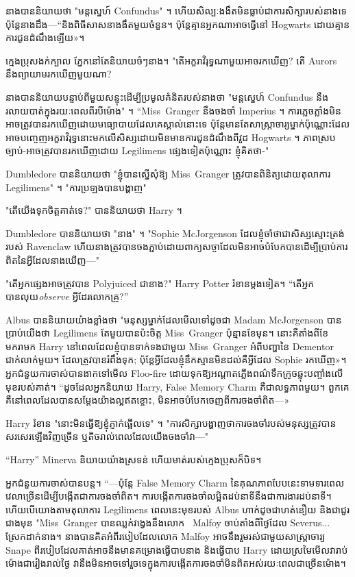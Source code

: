 {នាងបាននិយាយថា "មន្តស្នេហ៍ Confundus" ។ ហើយសិល្បៈងងឹតមិនធ្លាប់ជាការសិក្សារបស់នាងទេ ប៉ុន្តែនាងដឹង—“និងពិធីសាសនាងងឹតមួយចំនួន។ ប៉ុន្តែ​គ្មាន​អ្នក​ណា​អាច​ធ្វើ​នៅ Hogwarts ដោយ​គ្មាន​ការ​ជូន​ដំណឹង​ឡើយ»។

ក្មេងប្រុសងក់ក្បាល ភ្នែកនៅតែនិយាយចំៗនាង។ "តើអក្ខរាវិរុទ្ធណាមួយអាចរកឃើញ? តើ Aurors នឹងព្យាយាមរកឃើញមួយណា?

នាងបាននិយាយបន្ទាប់ពីមួយសន្ទុះដើម្បីប្រមូលគំនិតរបស់នាងថា "មន្តស្នេហ៍ Confundus នឹងរលាយបាត់ក្នុងរយៈពេលពីរបីម៉ោង" ។ “Miss~Granger នឹងចងចាំ Imperius ។ ការភ្លេចភ្លាំងមិនអាចត្រូវបានរកឃើញដោយមធ្យោបាយដែលគេស្គាល់នោះទេ ប៉ុន្តែមានតែសាស្រ្តាចារ្យម្នាក់ប៉ុណ្ណោះដែលអាចបញ្ចេញអក្ខរាវិរុទ្ធនោះមកលើសិស្សដោយមិនមានការជូនដំណឹងពីវួដ Hogwarts ។ ភាពស្របច្បាប់-អាចត្រូវបានរកឃើញដោយ Legilimens ផ្សេងទៀតប៉ុណ្ណោះ ខ្ញុំគិតថា-"

Dumbledore បាននិយាយថា "ខ្ញុំបានស្នើសុំឱ្យ Miss~Granger ត្រូវបានពិនិត្យដោយតុលាការ Legilimens" ។ "ការប្រឡងបានបង្ហាញ"

"តើយើងទុកចិត្តគាត់ទេ?" បាននិយាយថា Harry ។

Dumbledore បាននិយាយថា "នាង" ។ "Sophie McJorgenson ដែលខ្ញុំចាំថាជាសិស្សស្មោះត្រង់របស់ Ravenclaw ហើយនាងត្រូវបានចងភ្ជាប់ដោយពាក្យសច្ចាដែលមិនអាចបំបែកបានដើម្បីប្រាប់ការពិតនៃអ្វីដែលនាងឃើញ—"

"តើ​អ្នក​ផ្សេង​អាច​ត្រូវ​បាន Polyjuiced ជា​នាង?" Harry Potter រំខានម្តងទៀត។ “តើអ្នកបានលុយ\emph{observe} អ្វីដែរលោកគ្រូ?”

Albus បាននិយាយយ៉ាងខ្លាំងថា "មនុស្សម្នាក់ដែលមើលទៅដូចជា Madam McJorgenson បានប្រាប់យើងថា Legilimens តែមួយបានប៉ះចិត្ត Miss~Granger ប៉ុន្មានខែមុន។ នោះគឺតាំងពីខែមករាមក Harry នៅពេលដែលខ្ញុំបានទាក់ទងជាមួយ Miss~Granger អំពីបញ្ហានៃ Dementor ជាក់លាក់មួយ។ ដែលត្រូវបានរំពឹងទុក; ប៉ុន្តែ​អ្វី​ដែល​ខ្ញុំ​នឹក​ស្មាន​មិន​ដល់​គឺ​អ្វី​ដែល Sophie រក​ឃើញ»។ អ្នកជំនួយការចាស់បានងាកទៅមើល Floo-fire ដោយទុកឱ្យអណ្តាតភ្លើងពណ៌ទឹកក្រូចឆ្លុះបញ្ចាំងលើមុខរបស់គាត់។ “ដូចដែលអ្នកនិយាយ Harry, False Memory Charm គឺជាលទ្ធភាពមួយ។ ពួក​គេ​គឺ​នៅ​ពេល​ដែល​បាន​សម្ដែង​យ៉ាង​ល្អ​ឥត​ខ្ចោះ, មិន​អាច​បំបែក​ចេញ​ពី​ការ​ចងចាំ​ពិត—»

Harry រំខាន "នោះមិនធ្វើឱ្យខ្ញុំភ្ញាក់ផ្អើលទេ" ។ "ការសិក្សាបង្ហាញថាការចងចាំរបស់មនុស្សត្រូវបានសរសេរឡើងវិញច្រើន ឬតិចរាល់ពេលដែលយើងចងចាំវា—"

“Harry” Minerva និយាយយ៉ាងស្រទន់ ហើយមាត់របស់ក្មេងប្រុសក៏បិទ។

អ្នកជំនួយការចាស់បានបន្ត។ “—ប៉ុន្តែ False Memory Charm នៃគុណភាពបែបនេះទាមទារពេលវេលាច្រើនដើម្បីបង្កើតជាការចងចាំពិត។ ការបង្កើតការចងចាំលម្អិតដប់នាទីនឹងជាការងារដប់នាទី។ ហើយបើយោងតាមតុលាការ Legilimens ពេលនេះមុខរបស់ Albus ហាក់ដូចជាហត់នឿយ និងជាជួរជាងមុន "Miss~Granger បានឈ្លក់វង្វេងនឹងលោក~ Malfoy ចាប់តាំងពីថ្ងៃដែល Severus... ស្រែកដាក់នាង។ នាងបានគិតអំពីរបៀបដែលលោក Malfoy អាចនឹងរួមរស់ជាមួយសាស្រ្តាចារ្យ Snape ពីរបៀបដែលគាត់អាចនឹងមានគម្រោងធ្វើបាបនាង និងធ្វើបាប Harry ដោយស្រមៃមើលវារាប់ម៉ោងជារៀងរាល់ថ្ងៃ វានឹងមិនអាចទៅរួចទេក្នុងការបង្កើតការចងចាំមិនពិតអស់រយៈពេលជាច្រើនម៉ោង។

}
